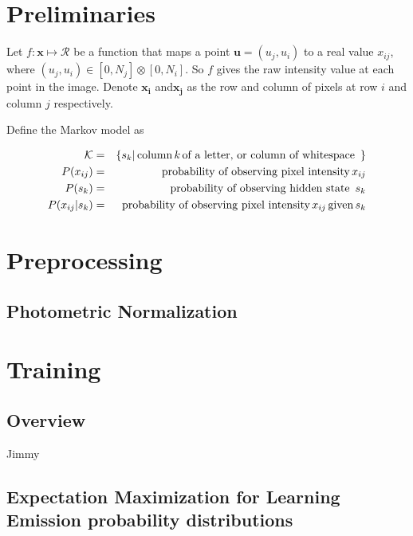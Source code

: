 \documentclass[a4paper,12pt]{article}
\newcounter{ohNoteCounter}
\newcommand{\ohnote}[1]{{\scriptsize  \color{Cgreen} $\clubsuit$~\refstepcounter{ohNoteCounter}\textsf{[OH]$_{\arabic{ohNoteCounter}}$:{#1}}}}
\newcounter{jpNoteCounter}
\newcommand{\jpnote}[1]{{\scriptsize  \color{Cblue} $\blacksquare$ \refstepcounter{jpNoteCounter}\textsf{[JP]$_{\arabic{jpNoteCounter}}$:{#1}}}}
\renewcommand{\jpnote}[1]{}
\renewcommand{\ohnote}[1]{}
\begin{document}
  \pagestyle{empty}
  \ohnote{This is useful way to leave notes. Both of us have command tu leave notes. I have \textbackslash ohnote, you have \textbackslash jpnote. Notes in whole document can be disabled by creating file with name ``.notes\_disabled''. }

  \jpnote{Your notes will look like this }

  \section{Preliminaries}
  Let $f : \mathbf{x} \mapsto \mathcal{R}$ be a function that maps a point $\mathbf{u} = (u_j,u_i)$ to a real value $x_{ij}$, where $(u_j,u_i) \in [0,N_j] \otimes [0,N_i]$.  So $f$ gives the raw intensity value at each point in the image.  Denote $\mathbf{x_i}$ and$\mathbf{x_j}$  as the row and column of pixels at row $i$ and column $j$ respectively.  

  Define the Markov model as 

  \begin{eqnarray*}
    \mathcal{K} &=& \{ s_k | \text{\,column\,} k \text{\,of a letter, or column of whitespace \,} \} \\
    P(x_{ij}) &=& \text{probability of observing pixel intensity\,} x_{ij} \\
    P(s_k) &=& \text{probability of observing hidden state \,} s_{k} \\
    P(x_{ij}|s_k) &=& \text{probability of observing pixel intensity\,} x_{ij} \text{\,given\,} s_k  
  \end{eqnarray*}

  \section{Preprocessing}
  \subsection{Photometric Normalization}

  \section{Training}
  \subsection{Overview}
  Jimmy

  \subsection{Expectation Maximization for Learning Emission probability distributions}
  \ohnote{Here are some notes, that we might use. It's not complete text} 
\end{document}

